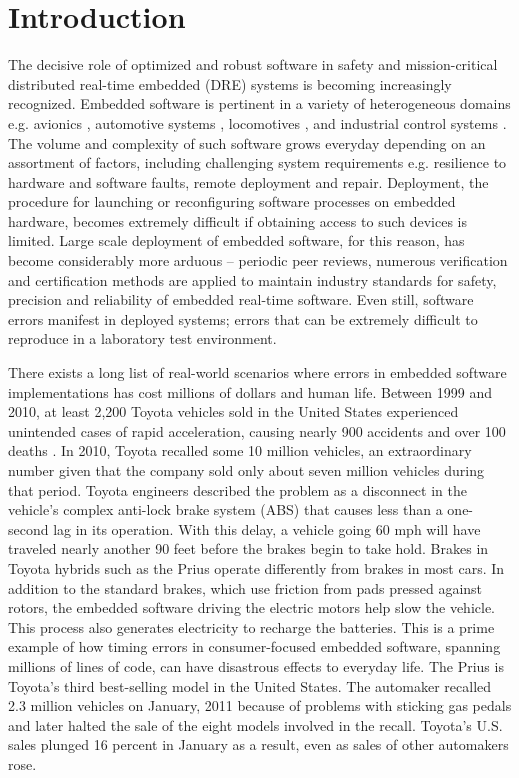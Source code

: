 \chapter{Introduction}
\label{chapter:introduction}

The decisive role of optimized and robust software in safety and mission-critical distributed real-time embedded (DRE) systems is becoming increasingly recognized. Embedded software is pertinent in a variety of heterogeneous domains e.g. avionics \cite{burke2010distributed}, automotive systems \cite{navet2008automotive}, locomotives \cite{zimmermann2003train}, and industrial control systems \cite{zoitl2008real}. The volume and complexity of such software grows everyday depending on an assortment of factors, including challenging system requirements e.g. resilience to hardware and software faults, remote deployment and repair. Deployment, the procedure for launching or reconfiguring software processes on embedded hardware, becomes extremely difficult if obtaining access to such devices is limited. Large scale deployment of embedded software, for this reason, has become considerably more arduous -- periodic peer reviews, numerous verification and certification methods are applied to maintain industry standards for safety, precision and reliability of embedded real-time software. Even still, software errors manifest in deployed systems; errors that can be extremely difficult to reproduce in a laboratory test environment. 

There exists a long list of real-world scenarios where errors in embedded software implementations has cost millions of dollars and human life. Between 1999 and 2010, at least 2,200 Toyota vehicles sold in the United States experienced unintended cases of rapid acceleration, causing nearly 900 accidents and over 100 deaths \cite{Cusumano:2011:RTD:1866739.1866750}. In 2010, Toyota recalled some 10 million vehicles, an extraordinary number given that the company sold only about seven million vehicles during that period. Toyota engineers described the problem as a disconnect in the vehicle's complex anti-lock brake system (ABS) that causes less than a one-second lag in its operation. With this delay, a vehicle going 60 mph will have traveled nearly another 90 feet before the brakes begin to take hold. Brakes in Toyota hybrids such as the Prius operate differently from brakes in most cars. In addition to the standard brakes, which use friction from pads pressed against rotors, the embedded software driving the electric motors help slow the vehicle. This process also generates electricity to recharge the batteries. This is a prime example of how timing errors in consumer-focused embedded software, spanning millions of lines of code, can have disastrous effects to everyday life. The Prius is Toyota's third best-selling model in the United States. The automaker recalled 2.3 million vehicles on January, 2011 because of problems with sticking gas pedals and later halted the sale of the eight models involved in the recall. Toyota's U.S. sales plunged 16 percent in January as a result, even as sales of other automakers rose.

